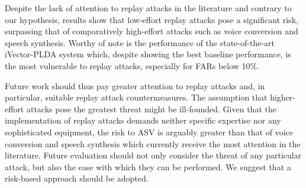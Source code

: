 
Despite the lack of attention to replay attacks in the literature and 
contrary to our hypothesis, results show that low-effort replay attacks pose a 
significant risk, surpassing that of comparatively high-effort attacks 
such as voice conversion and speech synthesis.  Worthy of note is the 
performance of the state-of-the-art iVector-PLDA system which, despite 
showing the best baseline performance, is the most vulnerable to replay 
attacks, especially for FARs below 10\%.

Future work should thus pay greater attention to replay attacks and, in 
particular, suitable replay attack countermeasures.  The assumption that higher-effort attacks pose the greatest threat might be ill-founded. Given that the implementation of replay attacks demands neither specific expertise nor any sophisticated equipment, the risk to ASV is arguably greater than that of voice conversion and speech synthesis which currently receive the most attention in the literature. Future evaluation should not only consider the threat of any particular attack, but also the ease with which they can be performed. We suggest that a risk-based approach should be adopted.
